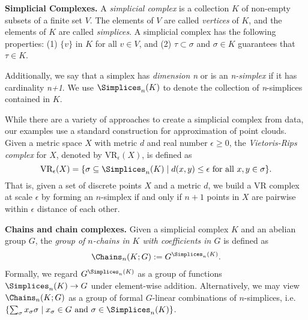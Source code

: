 \noindent \textbf{Simplicial Complexes.} A \textit{simplicial complex} is a collection $K$ of non-empty subsets of a finite set $V$. The elements of $V$ are called \textit{vertices} of $K$, and the elements of $K$ are called \textit{simplices}. A simplicial complex has the following properties: (1) $\{v\}$ in $K$ for all $v \in V$, and (2) $\tau \subset \sigma$ and $\sigma \in K$ guarantees that $\tau \in K$. %


Additionally, we say that a simplex has \textit{dimension n} or is an \textit{n-simplex} if it has cardinality \textit{n+1}. We use $\Simplices_n(K)$ to denote the collection of \textit{n}-simplices contained in $K$.%




While there are a variety of approaches to create a simplicial complex from data, our examples use a standard construction for approximation of point clouds.  Given a metric space $X$ with metric $d$ and real number $\epsilon \ge 0$, the \textit{Vietoris-Rips complex} for $X$, denoted by $\text{VR}_\epsilon(X)$, is defined as $$\text{VR}_\epsilon (X) = \{\sigma \subseteq \Simplices_n(K) \mid d(x,y) \leq  \epsilon \text{ for all } x, y \in \sigma\}.$$
That is, given a set of discrete points $X$ and a metric $d$, we build a VR complex at scale $\epsilon$ by forming an $n$-simplex if and only if $n+1$ points in $X$ are pairwise within $\epsilon$ distance of each other. 

\noindent \textbf{Chains and chain complexes.}
Given a simplicial complex $K$ and an abelian group  $G$, the \emph{group of $n$-chains in $K$ with coefficients in $G$} is defined as
%
    \begin{align*}
        \Chains_n(K; G) 
        :=
        G^{\Simplices_n(K)}.
    \end{align*}
%    
Formally, we regard $G^{\Simplices_n(K)}$ as a group of functions $\Simplices_n(K) \to G$ under element-wise addition. Alternatively, we may view $\Chains_n(K; G)$ as a group of formal $G$-linear combinations of $n$-simplices, i.e. $\left \{\sum_{\sigma}x_{\sigma} \sigma \mid x_{\sigma} \in G \text{ and } \sigma \in \Simplices_n(K) \right \}$.

